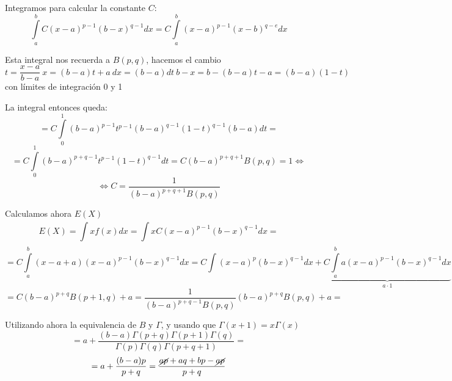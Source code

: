 \documentclass[openany]{book}
\begin{document}
\begin{exercise}
    $ $

    Integramos para calcular la constante $ C $:
    $$ \int\limits_{a}^{b} C(x-a)^{p-1}(b-x)^{q-1}dx = C \int\limits_{a}^{b} (x-a)^{p-1}(x-b)^{q-e}dx $$
    
    Esta integral nos recuerda a $ B(p,q) $, hacemos el cambio
    $$ t = \dfrac{x-a}{b-a}\ x = (b-a)t+a\ dx = (b-a)dt\  b-x = b-(b-a)t-a = (b-a)(1-t)$$
    con límites de integración 0 y 1

    La integral entonces queda:
    $$ = C\int\limits_{0}^{1} (b-a)^{p-1}t^{p-1} (b-a)^{q-1}(1-t)^{q-1} (b-a)dt =$$
    $$ = C \int\limits_{0}^{1}(b-a)^{p+q-1} t ^{p-1}(1-t)^{q-1}dt = C(b-a)^{p+q+1}B(p,q) = 1 \iff$$ $$\iff C = \dfrac{1}{(b-a)^{p+q+1}B(p,q)} $$

    Calculamos ahora $ E(X) $
    $$ E(X) = \int\limits_{}^{} xf(x) dx = \int\limits_{}^{} xC(x-a)^{p-1}(b-x)^{q-1}dx =  $$
    $$ = C \int\limits_{a}^{b}(x-a+a)(x-a)^{p-1}(b-x)^{q-1}dx = C\int\limits_{}^{} (x-a)^{p}(b-x)^{q-1}dx + \underbrace{C \int\limits_{a}^{b} a(x-a)^{p-1}(b-x)^{q-1}dx}_{a\cdot 1} $$
    $$ = C(b-a)^{p+q} B(p+1,q)+a = \dfrac{1}{(b-a)^{p+q-1}B(p,q)}(b-a)^{p+q}B(p,q)+a =  $$
    
    Utilizando ahora la equivalencia de $ B$ y $\Gamma $, y usando que $ \Gamma(x+1)=x\Gamma(x) $
    $$ = a + \dfrac{(b-a)\Gamma (p+q) \Gamma(p+1)\Gamma(q)}{\Gamma(p)\Gamma(q)\Gamma(p+q+1)} =$$
    $$ = a + \dfrac{(b-a)p}{p+q} = \dfrac{\cancel{ap}+aq+bp-\cancel{ap}}{p+q} $$
    
\end{exercise}
\end{document}
